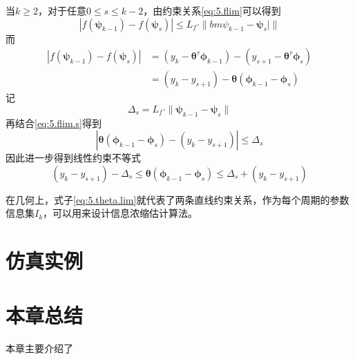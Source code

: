 当$k\geq2$，对于任意$0\leq s\leq k-2$，由约束关系\eqref{eq:5.flim}可以得到
\begin{equation}\label{eq:5.flim.s}
|f(\bm{\psi}_{k-1})-f(\bm{\psi}_{s})|\leq L_{f}\cdot\|bm{\psi}_{k-1}-\bm{\psi}_{s}|\|
\end{equation}
而
\begin{equation*}
\begin{split}%
|f(\bm{\psi}_{k-1})-f(\bm{\psi}_{s})|&=(y_{k}-\bm{\theta}^{\tau}\bm{\phi}_{k-1})-(y_{s+1}-\bm{\theta}^{\tau}\bm{\phi}_{s})\\
&=(y_{k}-y_{s+1})-\bm{\theta}(\bm{\phi}_{k-1}-\bm{\phi}_{s})
\end{split}
\end{equation*}
记
$$\Delta_{s}=L_{f}\cdot\|\bm{\psi}_{k-1}-\bm{\psi}_{s}\|$$
再结合\eqref{eq:5.flim.s}得到
\begin{equation}\label{eq:5.}
|\bm{\theta}(\bm{\phi}_{k-1}-\bm{\phi}_{s})-(y_{k}-y_{s+1})| \leq \Delta_{s}
\end{equation}
因此进一步得到线性约束不等式
\begin{equation}\label{eq:5.theta.lim}
(y_{k}-y_{s+1})-\Delta_{s}\leq \bm{\theta}(\bm{\phi}_{k-1}-\bm{\phi}_{s}) \leq \Delta_{s}+(y_{k}-y_{s+1})
\end{equation}

在几何上，式子\eqref{eq:5.theta.lim}就代表了两条直线约束关系，作为每个周期的参数信息集$I_{k}$，可以用来设计信息浓缩估计算法。

\section{仿真实例}

\section{本章总结}
本章主要介绍了